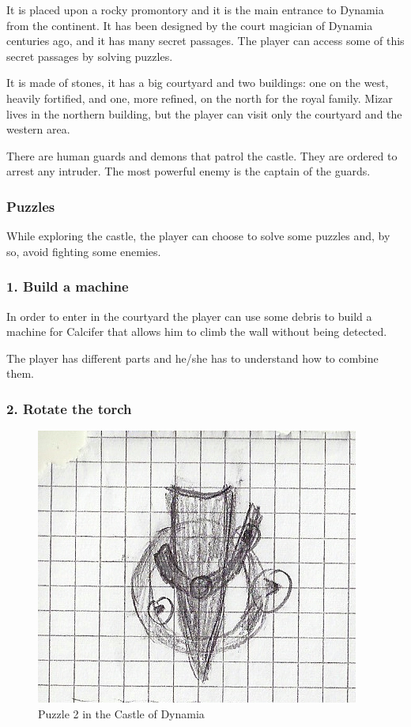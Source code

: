 It is placed upon a rocky promontory and it is the main entrance to Dynamia from the continent. It has been designed by the court magician of Dynamia centuries ago, and it has many secret passages. The player can access some of this secret passages by solving puzzles.

It is made of stones, it has a big courtyard and two buildings: one on the west, heavily fortified, and one, more refined, on the north for the royal family. Mizar lives in the northern building, but the player can visit only the courtyard and the western area.

There are human guards and demons that patrol the castle. They are ordered to arrest any intruder. The most powerful enemy is the captain of the guards.

\subsubsection{Puzzles}
While exploring the castle, the player can choose to solve some puzzles and, by so, avoid fighting some enemies.

\subsubsection*{1. Build a machine}

In order to enter in the courtyard the player can use some debris to build a machine for Calcifer that allows him to climb the wall without being detected.

The player has different parts and he/she has to understand how to combine them.

\subsubsection*{2. Rotate the torch}

\begin{figure}[H]
  \centering
  \includegraphics[width=\textwidth]{Images/Puzzles/castleOfDynamia_2}
  \caption{Puzzle 2 in the Castle of Dynamia}
\end{figure}

